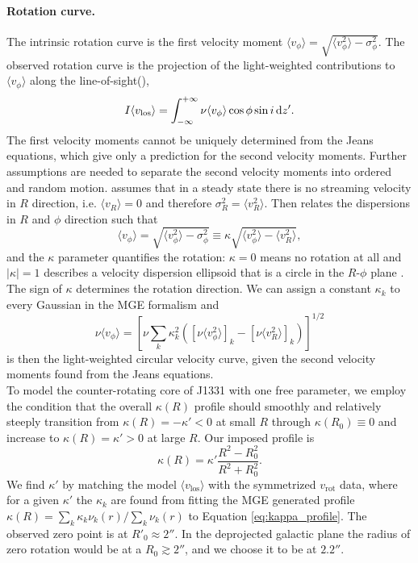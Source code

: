 \paragraph{Rotation curve.} The intrinsic rotation curve is the first velocity moment $\langle v_\phi\rangle = \sqrt{\langle v_\phi^2 \rangle - \sigma_\phi^2}$. The observed rotation curve is the projection of the light-weighted contributions to $\langle v_\phi\rangle$ along the line-of-sight(\cite{Cap08}),
\begin{equation*}
I \langle v_\text{los}\rangle = \int_{-\infty}^{+\infty} \nu \langle v_\phi\rangle \cos \phi \sin i \mathop{}\!\mathrm{d} z'.
\end{equation*}
The first velocity moments cannot be uniquely determined from the Jeans equations, which give only a prediction for the second velocity moments. Further assumptions are needed to separate the second velocity moments into ordered and random motion. \citet{Cap08} assumes that in a steady state there is no streaming velocity in $R$ direction, i.e. $\langle v_R \rangle = 0$ and therefore $\sigma_R^2 = \langle v_R^2 \rangle$. Then \citet{Cap08} relates the dispersions in $R$ and $\phi$ direction such that
$$\langle v_\phi\rangle = \sqrt{\langle v_\phi^2 \rangle - \sigma_\phi^2} \equiv \kappa \sqrt{\langle v_\phi^2 \rangle - \langle v_R^2 \rangle},$$
and the $\kappa$ parameter quantifies the rotation: $\kappa = 0$ means no rotation at all and $|\kappa| = 1$ describes a velocity dispersion ellipsoid that is a circle in the $R$-$\phi$ plane \citep{Cap08}. The sign of $\kappa$ determines the rotation direction. We can assign a constant $\kappa_k$ to every Gaussian in the MGE formalism and
\begin{equation*}
\nu \langle v_\phi\rangle = \left[\nu \sum_{k} \kappa_k^2 \left( [\nu\langle v_\phi^2 \rangle]_k - [\nu\langle v_R^2 \rangle]_k\right) \right]^{1/2}
\end{equation*} 
is then the light-weighted circular velocity curve, given the second velocity moments found from the Jeans equations.
\\To model the counter-rotating core of J1331 with one free parameter, we employ the condition that the overall $\kappa(R)$ profile should smoothly and relatively steeply transition from $\kappa(R) = -\kappa' < 0$ at small $R$ through $\kappa(R_0) \equiv 0$ and increase to $\kappa(R) = \kappa' > 0$ at large $R$. Our imposed profile is
\begin{equation}
\kappa(R) = \kappa' \frac{R^2 - R_0^2}{R^2 + R_0^2}. \label{eq:kappa_profile}
\end{equation}
We find $\kappa'$ by matching the model $\langle v_\text{los} \rangle$ with the symmetrized $v_\text{rot}$ data, where for a given $\kappa'$ the $\kappa_k$ are found from fitting the MGE generated profile $\kappa(R) = \sum_k \kappa_k \nu_k(r)/\sum_k \nu_k(r)$ to Equation \ref{eq:kappa_profile}. The observed zero point is at $R'_0\approx 2''$. In the deprojected galactic plane the radius of zero rotation would be at a $R_0 \gtrsim 2''$, and we choose it to be at $2.2''$.


